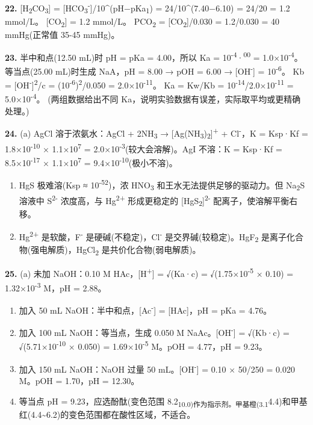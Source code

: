 \textbf{22.} {[}H\textsubscript{2}CO\textsubscript{3}{]} = {[}HCO\textsubscript{3}\textsuperscript{-}{]}/10\^{}(pH−pKa\textsubscript{1}) = 24/10\^{}(7.40−6.10) = 24/20 = 1.2 mmol/L。
{[}CO\textsubscript{2}{]} = 1.2 mmol/L。
PCO\textsubscript{2} = {[}CO\textsubscript{2}{]}/0.030 = 1.2/0.030 = 40 mmHg(正常值 35-45 mmHg)。

\textbf{23.} 半中和点(12.50 mL)时 pH = pKa = 4.00，所以 Ka = 10\textsuperscript{-4}·\textsuperscript{00} = 1.0×10\textsuperscript{-4}。
等当点(25.00 mL)时生成 NaA，pH = 8.00 → pOH = 6.00 → {[}OH\textsuperscript{-}{]} = 10\textsuperscript{-6}。
Kb = {[}OH\textsuperscript{-}{]}\textsuperscript{2}/c = (10\textsuperscript{-6})\textsuperscript{2}/0.050 = 2.0×10\textsuperscript{-11}。
Ka = Kw/Kb = 10\textsuperscript{-14}/2.0×10\textsuperscript{-11} = 5.0×10\textsuperscript{-4}。
(两组数据给出不同 Ka，说明实验数据有误差，实际取平均或更精确处理。)

\textbf{24.}
(a) AgCl 溶于浓氨水：AgCl + 2NH\textsubscript{3} → {[}Ag(NH\textsubscript{3})\textsubscript{2}{]}\textsuperscript{+} + Cl\textsuperscript{-}，K = Ksp·Kf = 1.8×10\textsuperscript{-10} × 1.1×10\textsuperscript{7} = 2.0×10\textsuperscript{-3}(较大会溶解)。AgI 不溶：K = Ksp·Kf = 8.5×10\textsuperscript{-17} × 1.1×10\textsuperscript{7} = 9.4×10\textsuperscript{-10}(极小不溶)。

\begin{enumerate}
\def\labelenumi{(\alph{enumi})}
\setcounter{enumi}{1}
\item
  HgS 极难溶(Ksp ≈ 10\textsuperscript{-52})，浓 HNO\textsubscript{3} 和王水无法提供足够的驱动力。但 Na\textsubscript{2}S 溶液中 S\textsuperscript{2-} 浓度高，与 Hg\textsuperscript{2+} 形成更稳定的 {[}HgS\textsubscript{2}{]}\textsuperscript{2-} 配离子，使溶解平衡右移。
\item
  Hg\textsuperscript{2+} 是软酸，F\textsuperscript{-} 是硬碱(不稳定)，Cl\textsuperscript{-} 是交界碱(较稳定)。HgF\textsubscript{2} 是离子化合物(强电解质)，HgCl\textsubscript{2} 是共价化合物(弱电解质)。
\end{enumerate}

\textbf{25.}
(a) 未加 NaOH：0.10 M HAc，{[}H\textsuperscript{+}{]} = √(Ka·c) = √(1.75×10\textsuperscript{-5} × 0.10) = 1.32×10\textsuperscript{-3} M，pH = 2.88。

\begin{enumerate}
\def\labelenumi{(\alph{enumi})}
\setcounter{enumi}{1}
\item
  加入 50 mL NaOH：半中和点，{[}Ac\textsuperscript{-}{]} = {[}HAc{]}，pH = pKa = 4.76。
\item
  加入 100 mL NaOH：等当点，生成 0.050 M NaAc。{[}OH\textsuperscript{-}{]} = √(Kb·c) = √(5.71×10\textsuperscript{-10} × 0.050) = 1.69×10\textsuperscript{-5} M。pOH = 4.77，pH = 9.23。
\item
  加入 150 mL NaOH：NaOH 过量 50 mL。{[}OH\textsuperscript{-}{]} = 0.10 × 50/250 = 0.020 M。pOH = 1.70，pH = 12.30。
\item
  等当点 pH = 9.23，应选酚酞(变色范围 8.2\textsubscript{10.0)作为指示剂。甲基橙(3.1}4.4)和甲基红(4.4\textasciitilde6.2)的变色范围都在酸性区域，不适合。
\end{enumerate}
